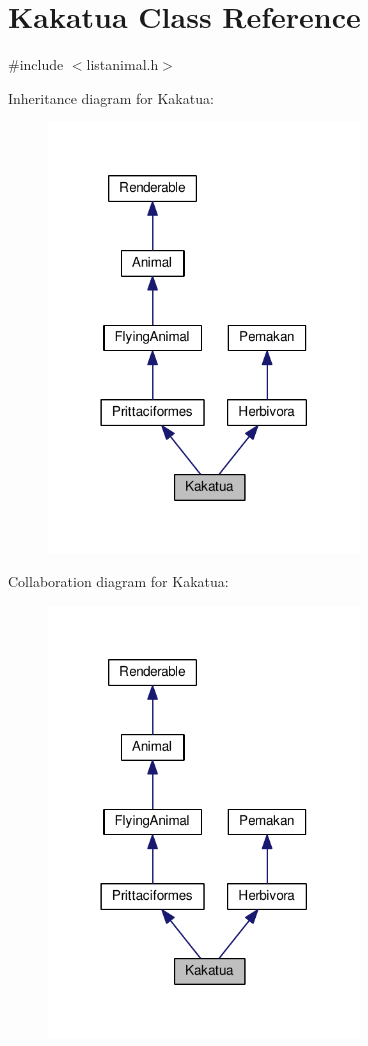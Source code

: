 \hypertarget{classKakatua}{}\section{Kakatua Class Reference}
\label{classKakatua}


{\ttfamily \#include $<$listanimal.\+h$>$}



Inheritance diagram for Kakatua\+:
\nopagebreak
\begin{figure}[H]
\begin{center}
\leavevmode
\includegraphics[width=234pt]{classKakatua__inherit__graph}
\end{center}
\end{figure}


Collaboration diagram for Kakatua\+:
\nopagebreak
\begin{figure}[H]
\begin{center}
\leavevmode
\includegraphics[width=234pt]{classKakatua__coll__graph}
\end{center}
\end{figure}
